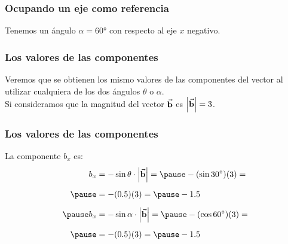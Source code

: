\documentclass[12pt]{beamer}
\begin{document}
\begin{frame}
\frametitle{Ocupando un eje como referencia}
\begin{minipage}{0.35\linewidth}
\begin{figure}
\centering
{}
\end{figure}
\end{minipage}
\begin{minipage}{0.6\linewidth}
Tenemos un ángulo $\alpha = \ang{60}$ con respecto al eje $x$ negativo.
\end{minipage}
\end{frame}
\begin{frame}
\frametitle{Los valores de las componentes}
Veremos que se obtienen los mismo valores de las componentes del vector al utilizar cualquiera de los dos ángulos $\theta$ o $\alpha$.
\\
\bigskip
\pause
Si consideramos que la magnitud del vector $\va{b}$ es $\abs{\va{b}} = 3$.
\end{frame}
\begin{frame}
\frametitle{Los valores de las componentes}
\begin{minipage}{0.35\linewidth}
\begin{figure}
\centering
{}
\end{figure}
\end{minipage}
\begin{minipage}{0.6\linewidth}
La componente $b_{x}$ es:
\pause
\begin{eqnarray*}
\begin{aligned}
b_{x} &= - \sin \theta \cdot \abs{\va{b}} = \pause -(\sin \ang{30})(3) = \\[0.5em] \pause
&= -(0.5)(3) = \pause -1.5 \\[0.5em] \pause
b_{x} &= -\sin \alpha \cdot \abs{\va{b}} = \pause - (\cos \ang{60})(3) = \\[0.5em] \pause
&= - (0.5)(3) = \pause - 1.5
\end{aligned}
\end{eqnarray*}
\end{minipage}
\end{frame}
\end{document}
